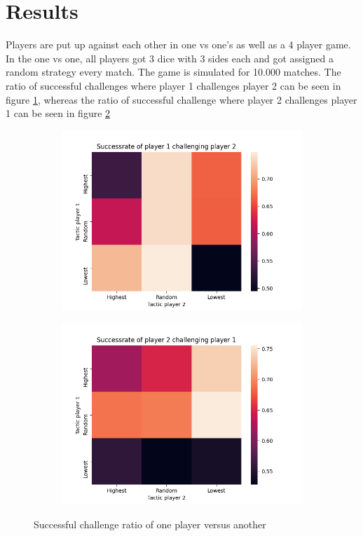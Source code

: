 \documentclass{article}
\begin{document}
\section*{Results}
Players are put up against each other in one vs one's as well as a 4 player game. In the one vs one, all players got 3 dice with 3 sides each and got assigned a random strategy every match. The game is simulated for 10.000 matches. The ratio of successful challenges where player 1 challenges player 2 can be seen in figure \ref{fig:1v1_1c2}, whereas the ratio of successful challenge where player 2 challenges player 1 can be seen in figure \ref{fig:1v1_2c1}
\begin{figure}
     \centering
     \begin{subfigure}[b]{0.49\textwidth}
        \centering
        \includegraphics[width=\textwidth]{img/1c2.png}
        \caption{}
        \label{fig:1v1_1c2}
     \end{subfigure}
     \hfill
     \begin{subfigure}[b]{0.49\textwidth}
    \centering
        \includegraphics[width=\textwidth]{img/2c1.png}
        \caption{}
        \label{fig:1v1_2c1}
     \end{subfigure}
     \caption{Successful challenge ratio of one player versus another}
     \label{fig:1v1}
\end{figure}\\
\end{document}
